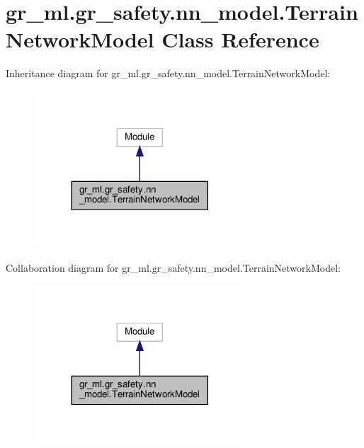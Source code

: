 \hypertarget{classgr__ml_1_1gr__safety_1_1nn__model_1_1TerrainNetworkModel}{}\section{gr\+\_\+ml.\+gr\+\_\+safety.\+nn\+\_\+model.\+Terrain\+Network\+Model Class Reference}
\label{classgr__ml_1_1gr__safety_1_1nn__model_1_1TerrainNetworkModel}


Inheritance diagram for gr\+\_\+ml.\+gr\+\_\+safety.\+nn\+\_\+model.\+Terrain\+Network\+Model\+:
\nopagebreak
\begin{figure}[H]
\begin{center}
\leavevmode
\includegraphics[width=224pt]{classgr__ml_1_1gr__safety_1_1nn__model_1_1TerrainNetworkModel__inherit__graph}
\end{center}
\end{figure}


Collaboration diagram for gr\+\_\+ml.\+gr\+\_\+safety.\+nn\+\_\+model.\+Terrain\+Network\+Model\+:
\nopagebreak
\begin{figure}[H]
\begin{center}
\leavevmode
\includegraphics[width=224pt]{classgr__ml_1_1gr__safety_1_1nn__model_1_1TerrainNetworkModel__coll__graph}
\end{center}
\end{figure}
